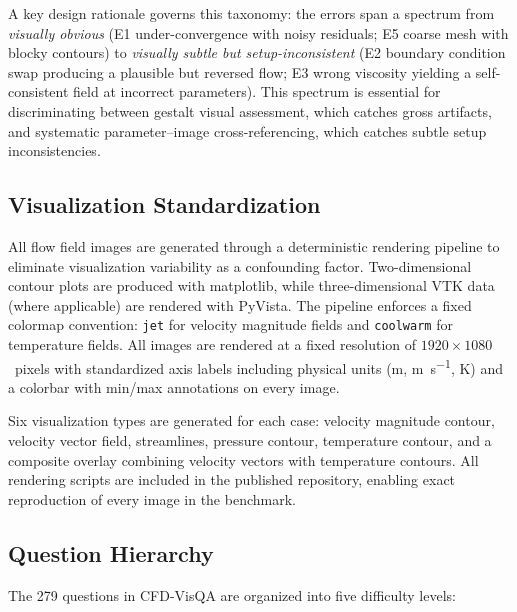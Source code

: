 \documentclass[preprint,12pt]{elsarticle}
\begin{document}
A key design rationale governs this taxonomy: the errors span a spectrum from
\emph{visually obvious} (E1 under-convergence with noisy residuals; E5 coarse
mesh with blocky contours) to \emph{visually subtle but setup-inconsistent} (E2
boundary condition swap producing a plausible but reversed flow; E3 wrong
viscosity yielding a self-consistent field at incorrect parameters). This
spectrum is essential for discriminating between gestalt visual assessment, which
catches gross artifacts, and systematic parameter--image cross-referencing, which
catches subtle setup inconsistencies.

\subsection{Visualization Standardization}
\label{sec:visualization}

All flow field images are generated through a deterministic rendering pipeline to
eliminate visualization variability as a confounding factor. Two-dimensional
contour plots are produced with matplotlib, while three-dimensional VTK data
(where applicable) are rendered with PyVista. The pipeline enforces a fixed
colormap convention: \texttt{jet} for velocity magnitude fields and
\texttt{coolwarm} for temperature fields. All images are rendered at a fixed
resolution of $1920 \times 1080$~pixels with standardized axis labels including
physical units (\si{\metre}, \si{\metre\per\second}, \si{\kelvin}) and a
colorbar with min/max annotations on every image.

Six visualization types are generated for each case: velocity magnitude contour,
velocity vector field, streamlines, pressure contour, temperature contour, and a
composite overlay combining velocity vectors with temperature contours. All
rendering scripts are included in the published repository, enabling exact
reproduction of every image in the benchmark.

\subsection{Question Hierarchy}
\label{sec:question-hierarchy}

The 279 questions in CFD-VisQA are organized into five difficulty levels:
\end{document}
